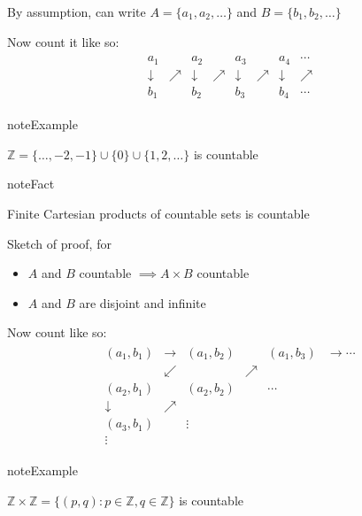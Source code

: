 \documentclass[letterpaper,10pt,english]{jupyterBook}
\begin{document}
\sphinxAtStartPar
By assumption, can write \(A = \{a_1, a_2, \ldots\}\) and \(B = \{b_1, b_2,
\ldots\}\)

\sphinxAtStartPar
Now count it like so:
\begin{equation*}
\begin{split}
\begin{matrix}
a_1 &      & a_2 &      & a_3 &      & a_4 & \cdots\\
\downarrow & \nearrow & \downarrow & \nearrow & \downarrow & \nearrow & \downarrow & \nearrow \\
b_1 &      & b_2 &      & b_3 &      & b_4 & \cdots  
\end{matrix}
\end{split}
\end{equation*}
\begin{sphinxadmonition}{note}{Example}

\sphinxAtStartPar
\(\mathbb{Z} = \{\ldots, -2, -1\} \cup \{ 0 \} \cup \{1, 2, \ldots\}\) is countable
\end{sphinxadmonition}

\begin{sphinxadmonition}{note}{Fact}

\sphinxAtStartPar
Finite Cartesian products of countable sets is countable
\end{sphinxadmonition}

\sphinxAtStartPar
Sketch of proof, for
\begin{itemize}
\item {} 
\sphinxAtStartPar
\(A\) and \(B\) countable \(\implies A \times B\) countable

\item {} 
\sphinxAtStartPar
\(A\) and \(B\) are disjoint and infinite

\end{itemize}

\sphinxAtStartPar
Now count like so:
\begin{equation*}
\begin{split}
\begin{matrix}
(a_{1},b_{1})&\to &(a_{1},b_{2})&       & (a_{1},b_{3})&\to\cdots\\
&\swarrow&             &\nearrow   &              & \\
(a_{2},b_{1})&    &(a_{2},b_{2})&       &\cdots        & \\
\downarrow   &\nearrow&             &       &              & \\
(a_{3},b_{1})&    &\vdots       &       &              & \\
\vdots       &    &             &       &              & 
\end{matrix}
\end{split}
\end{equation*}
\begin{sphinxadmonition}{note}{Example}

\sphinxAtStartPar
\(\mathbb{Z} \times \mathbb{Z} = \{ (p,q) : p \in \mathbb{Z}, q \in \mathbb{Z} \}\) is countable
\end{sphinxadmonition}
\end{document}
